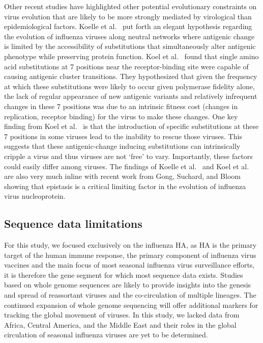 \documentclass[11pt,oneside,letterpaper]{article}
\begin{document}
Other recent studies have highlighted other potential evolutionary constraints on virus evolution that are likely to be more strongly mediated by virological than epidemiological factors.
Koelle et al.\ \cite{Koelle06} put forth an elegant hypothesis regarding the evolution of influenza viruses along neutral networks where antigenic change is limited by the accessibility of substitutions that simultaneously alter antigenic phenotype while preserving protein function.
Koel et al.\ \cite{Koel13} found that single amino acid substitutions at 7 positions near the receptor-binding site were capable of causing antigenic cluster transitions.
They hypothesized that given the frequency at which these substitutions were likely to occur given polymerase fidelity alone, the lack of regular appearance of new antigenic variants and relatively infrequent changes in these 7 positions was due to an intrinsic fitness cost (changes in replication, receptor binding) for the virus to make these changes.
One key finding from Koel et al.\ \cite{Koel13} is that the introduction of specific substitutions at these 7 positions in some viruses lead to the inability to rescue those viruses.
This suggests that these antigenic-change inducing substitutions can intrinsically cripple a virus and thus viruses are not `free' to vary.
Importantly, these factors could easily differ among viruses.
The findings of Koelle et al.\ \cite{Koelle06} and Koel et al.\ \cite{Koel13} are also very much inline with recent work from Gong, Suchard, and Bloom \cite{Gong13} showing that epistasis is a critical limiting factor in the evolution of influenza virus nucleoprotein.



\subsection*{Sequence data limitations}

For this study, we focused exclusively on the influenza HA, as HA is the primary target of the human immune response, the primary component of influenza virus vaccines and the main focus of most seasonal influenza virus surveillance efforts, it is therefore the gene segment for which most sequence data exists.
Studies based on whole genome sequences are likely to provide insights into the genesis and spread of reassortant viruses and the co-circulation of multiple lineages.
The continued expansion of whole genome sequencing will offer additional markers for tracking the global movement of viruses.
In this study, we lacked data from Africa, Central America, and the Middle East and their roles in the global circulation of seasonal influenza viruses are yet to be determined.



\end{document}

